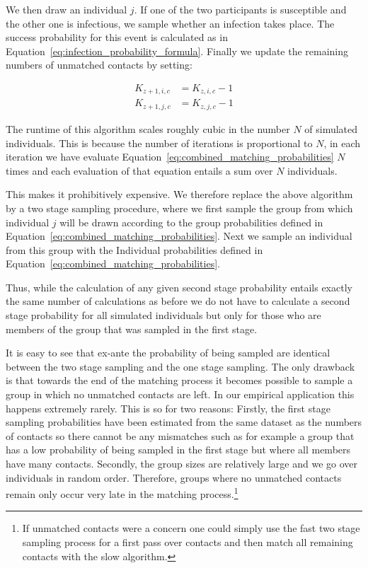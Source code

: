 We then draw an individual $j$. If one of the two participants is susceptible and the
other one is infectious, we sample whether an infection takes place. The success
probability for this event is calculated as in
Equation~\ref{eq:infection_probability_formula}. Finally we update the remaining
numbers of unmatched contacts by setting:

\begin{align}
    K_{z+1,i,c} &= K_{z, i, c} - 1 \\
    K_{z+1, j, c} &= K_{z, j, c} - 1
\end{align}


The runtime of this algorithm scales roughly cubic in the number $N$ of simulated
individuals. This is because the number of iterations is proportional to $N$, in each
iteration we have evaluate Equation~\ref{eq:combined_matching_probabilities} $N$ times
and each evaluation of that equation entails a sum over $N$ individuals.

This makes it prohibitively expensive. We
therefore replace the above algorithm by a two stage sampling procedure, where we
first sample the group from which individual $j$ will be drawn according to the
group probabilities defined in Equation~\ref{eq:combined_matching_probabilities}.
Next we sample an individual from this group with the Individual probabilities defined
in Equation~\ref{eq:combined_matching_probabilities}.

Thus, while the calculation of any given second stage probability entails exactly the
same number of calculations as before we do not have to calculate a second stage
probability for all simulated individuals but only for those who are members of
the group that was sampled in the first stage.

It is easy to see that ex-ante the probability of being sampled are identical between
the two stage sampling and the one stage sampling. The only drawback is
that towards the end of the matching process it becomes possible to sample a group in
which no unmatched contacts are left. In our empirical application this happens
extremely rarely. This is so for two reasons: Firstly, the first stage sampling
probabilities have been estimated from the same dataset as the numbers of contacts so
there cannot be any mismatches such as for example a group that has a low probability
of being sampled in the first stage but where all members have many contacts.
Secondly, the group sizes are relatively large and we go over individuals in random
order. Therefore, groups where no unmatched contacts remain only occur very late in the
matching process.\footnote{If unmatched contacts were a concern one could simply
use the fast two stage sampling process for a first pass over contacts and then
match all remaining contacts with the slow algorithm.}




